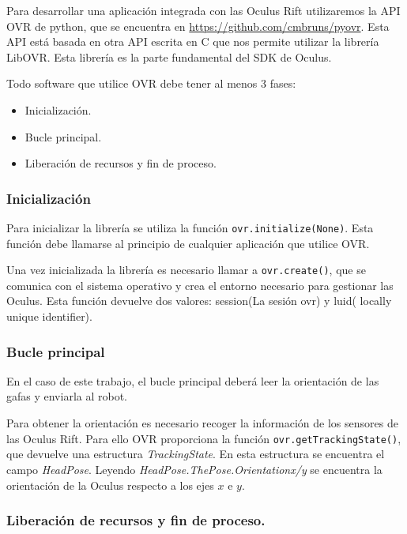 \documentclass[twoside, 11pt]{epstfg}
\begin{document}
Para desarrollar una aplicación integrada con las Oculus Rift utilizaremos la API OVR de python, que se encuentra en \url{https://github.com/cmbruns/pyovr}. Esta API está basada en otra API escrita en C que nos permite utilizar la librería LibOVR. Esta librería es la parte fundamental del SDK de Oculus.

Todo software que utilice OVR debe tener al menos 3 fases:
\begin{itemize}
	\item Inicialización.
	\item Bucle principal.
	\item Liberación de recursos y fin de proceso. 
\end{itemize}

\subsubsection{Inicialización}


Para inicializar la librería se utiliza la función \texttt{ovr.initialize(None)}. Esta función debe llamarse al principio de cualquier aplicación que utilice OVR.

Una vez inicializada la librería es necesario llamar a \texttt{ovr.create()}, que se comunica con el sistema operativo y crea el entorno necesario para gestionar las Oculus. Esta función devuelve dos valores: session(La sesión ovr) y luid( locally unique identifier). 

\subsubsection{Bucle principal}

En el caso de este trabajo, el bucle principal deberá leer la orientación de las gafas y enviarla al robot.

Para obtener la orientación es necesario recoger la información de los sensores de las Oculus Rift. Para ello OVR proporciona la función \texttt{ovr.getTrackingState()}, que devuelve una estructura \textit{TrackingState}. En esta estructura se encuentra el campo \textit{HeadPose}. Leyendo \textit{HeadPose.ThePose.Orientationx/y} se encuentra la orientación de la Oculus respecto a los ejes $x$ e $y$.

\subsubsection{Liberación de recursos y fin de proceso.}
\end{document}
